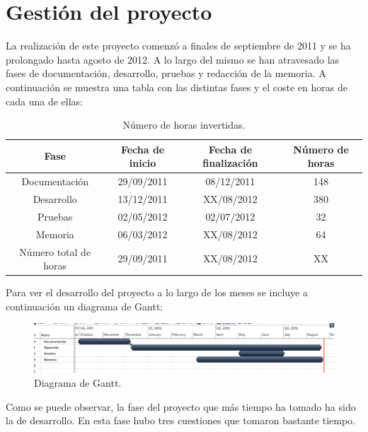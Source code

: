 \chapter{Gestión del proyecto}
\label{anx:gestion}



La realización de este proyecto comenzó a finales de septiembre de 2011 y se ha prolongado hasta agosto de 2012. A lo largo del mismo se han atravesado las fases de documentación, desarrollo, pruebas y redacción de la memoria. A continuación se muestra una tabla con las distintas fases y el coste en horas de cada una de ellas:

\begin{table}[!htbp]
\centering
   \begin{tabular}{|c|c|c|c|}
      \hline
      \textbf{Fase} & \textbf{Fecha de inicio} & \textbf{Fecha de finalización} & \textbf{Número de horas} \\ \hline
      Documentación & 29/09/2011 & 08/12/2011 & 148 \\ \hline
      Desarrollo & 13/12/2011 & XX/08/2012 & 380 \\ \hline
      Pruebas & 02/05/2012 & 02/07/2012 & 32 \\ \hline
      Memoria & 06/03/2012 & XX/08/2012 & 64 \\ \hline
      \hline
      Número total de horas & 29/09/2011 & XX/08/2012 & XX \\ \hline
   \end{tabular}
\caption{Número de horas invertidas.}
\label{table:horas}
\end{table}

Para ver el desarrollo del proyecto a lo largo de los meses se incluye a continuación un diagrama de Gantt:

\begin{figure} [!htbp]
  \centering
  \includegraphics[width=13.5cm]{imagenes/gantt.png}
  \caption{Diagrama de Gantt.}
\label{figure:gantt}
\end{figure}


Como se puede observar, la fase del proyecto que más tiempo ha tomado ha sido la de desarrollo. En esta fase hubo tres cuestiones que tomaron bastante tiempo.

